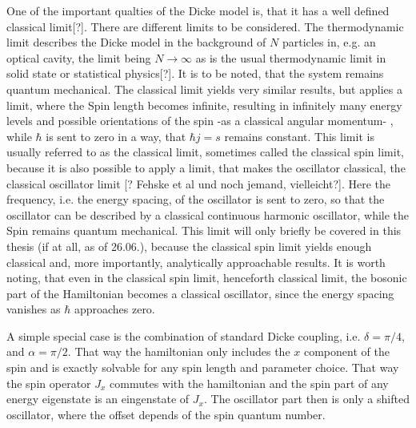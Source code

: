 One of the important qualties of the Dicke model is, that it has a well defined classical limit[?].
There are different limits to be considered. 
The thermodynamic limit describes the Dicke model in the background of $N$ particles in, e.g. an optical cavity, the limit being $N\rightarrow \infty$ as is the usual thermodynamic limit in solid state or statistical physics[?].
It is to be noted, that the system remains quantum mechanical.
The classical limit yields very similar results, but applies a limit, where the Spin length becomes infinite, resulting in infinitely many energy levels and possible orientations of the spin -as a classical angular momentum- , while $\hbar$ is sent to zero in a way, that $\hbar j = s$ remains constant.
This limit is usually referred to as the classical limit, sometimes called the classical spin limit, because it is also possible to apply a limit, that makes the oscillator classical, the classical oscillator limit [? Fehske et al und noch jemand, vielleicht?].
Here the frequency, i.e. the energy spacing, of the oscillator is sent to zero, so that the oscillator can be described by a classical continuous harmonic oscillator, while the Spin remains quantum mechanical.
This limit will only briefly be covered in this thesis (if at all, as of 26.06.), because the classical spin limit yields enough classical and, more importantly, analytically approachable results.
It is worth noting, that even in the classical spin limit, henceforth classical limit, the bosonic part of the Hamiltonian becomes a classical oscillator, since the energy spacing vanishes as $\hbar$ approaches zero.

A simple special case is the combination of standard Dicke coupling, i.e. $\delta = \pi/4$, and $\alpha = \pi/2$. That way the hamiltonian only includes the $x$ component of the spin and is exactly solvable for any spin length and parameter choice.
That way the spin operator $J_x$ commutes with the hamiltonian and the spin part of any energy eigenstate is an eingenstate of $J_x$. 
The oscillator part then is only a shifted oscillator, where the offset depends of the spin quantum number.


